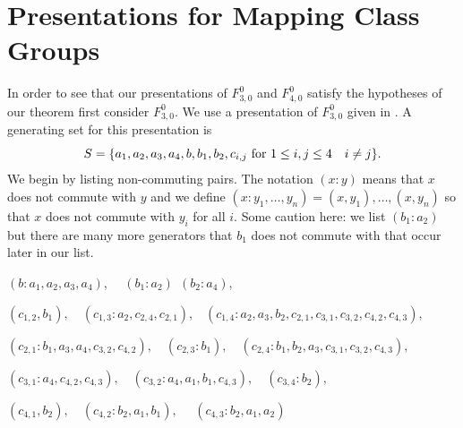 \documentclass[12pt]{article}
\numberwithin{equation}{section}
\begin{document}
 \section{Presentations for Mapping Class Groups}\label{PMCG}
In order to see that our presentations of $F_{3,0}^0$ and $F_{4,0}^0$ satisfy the hypotheses of our theorem first consider $F_{3,0}^0$. We use a presentation of $F_{3,0}^0$ given in \cite{Ge01}. A generating set for this presentation is 
$$S=\{a_1,a_2,a_3,a_4, b,b_1,b_2, c_{i,j} \hbox{ for } 1\leq i,j\leq 4\ \ \  i\ne j\}.$$
We begin by listing non-commuting pairs.  The notation $(x:y)$ means that $x$ does not commute with $y$ and we define $(x:y_1,\ldots, y_n)=(x,y_1),\ldots, (x,y_n)$ so that $x$ does not commute with $y_i$ for all $i$.  Some caution here: we list $(b_1:a_2)$ but there are many more generators that $b_1$ does not commute with that occur later in our list. 

$(b:a_1,a_2,a_3,a_4)$,  \ \ $(b_1:a_2) \ \ (b_2:a_4),$ 

$(c_{1,2}, b_1),$\ \ $(c_{1,3}: a_2,c_{2,4}, c_{2,1})$,\ \ $(c_{1,4}:a_2,a_3,b_2,c_{2,1},c_{3,1},c_{3,2}, c_{4,2}, c_{4,3}),$

$(c_{2,1}: b_1, a_3,a_4, c_{3,2}, c_{4,2}),$\ \ $(c_{2,3}: b_1),$\ \ $(c_{2,4}:b_1,b_2,a_3, c_{3,1}, c_{3,2}, c_{4,3}),$

$(c_{3,1}: a_4, c_{4,2}, c_{4,3}), $\ \ $(c_{3,2}:a_4,a_1, b_1, c_{4,3}),$\ \ $(c_{3,4}: b_2),$

$(c_{4,1}, b_2),$\ \ $(c_{4,2}:b_2, a_1,b_1),$ \ \ $(c_{4,3}: b_2,a_1,a_2)$
\end{document}
